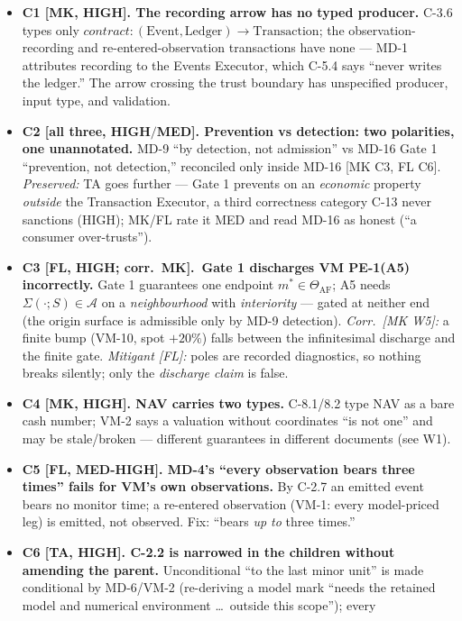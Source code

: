 \documentclass[11pt,a4paper]{article}
\begin{document}
\begin{itemize}\setlength{\itemsep}{0pt}
  \item \textbf{C1 [MK, HIGH]. The recording arrow has no typed producer.} C-3.6 types only
  $\mathit{contract}:(\mathrm{Event},\mathrm{Ledger})\to\mathrm{Transaction}$; the
  observation-recording and re-entered-observation transactions have none --- MD-1 attributes
  recording to the Events Executor, which C-5.4 says ``never writes the ledger.'' The arrow
  crossing the trust boundary has unspecified producer, input type, and validation.
  \item \textbf{C2 [all three, HIGH$/$MED]. Prevention vs detection: two polarities, one
  unannotated.} MD-9 ``by detection, not admission'' vs MD-16 Gate 1 ``prevention, not
  detection,'' reconciled only inside MD-16 [MK C3, FL C6]. \emph{Preserved:} TA goes further ---
  Gate 1 prevents on an \emph{economic} property \emph{outside} the Transaction Executor, a
  third correctness category C-13 never sanctions (HIGH); MK/FL rate it MED and read MD-16 as
  honest (``a consumer over-trusts'').
  \item \textbf{C3 [FL, HIGH; corr.\ MK].\ Gate 1 discharges VM PE-1(A5) incorrectly.} Gate 1
  guarantees one endpoint $m^\ast\in\Theta_{\mathrm{AF}}$; A5 needs $\Sigma(\cdot;S)\in\mathcal{A}$
  on a \emph{neighbourhood} with \emph{interiority} --- gated at neither end (the origin surface
  is admissible only by MD-9 detection). \emph{Corr.\ [MK W5]:} a finite bump (VM-10, spot
  $+20\%$) falls between the infinitesimal discharge and the finite gate. \emph{Mitigant [FL]:}
  poles are recorded diagnostics, so nothing breaks silently; only the \emph{discharge claim} is
  false.
  \item \textbf{C4 [MK, HIGH]. NAV carries two types.} C-8.1/8.2 type NAV as a bare cash number;
  VM-2 says a valuation without coordinates ``is not one'' and may be stale/broken --- different
  guarantees in different documents (see W1).
  \item \textbf{C5 [FL, MED-HIGH]. MD-4's ``every observation bears three times'' fails for VM's
  own observations.} By C-2.7 an emitted event bears no monitor time; a re-entered observation
  (VM-1: every model-priced leg) is emitted, not observed. Fix: ``bears \emph{up to} three
  times.''
  \item \textbf{C6 [TA, HIGH]. C-2.2 is narrowed in the children without amending the parent.}
  Unconditional ``to the last minor unit'' is made conditional by MD-6/VM-2 (re-deriving a model
  mark ``needs the retained model and numerical environment \dots\ outside this scope''); every

\end{itemize}
\end{document}
